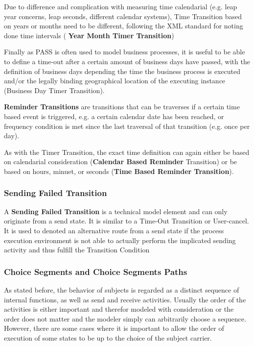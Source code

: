 Due to difference and complication with measuring time calendarial (e.g. leap year concerns, leap seconds, different calendar systems), Time Transition based on years or months need to be different, following the XML standard for noting done time intervals ( \textbf{Year Month Timer Transition})

Finally as PASS is often used to model business processes, it is useful to be able to define a time-out after a certain amount of business days have passed, with the definition of business days depending the time the business process is executed and/or the legally binding geographical location of the executing instance (Business Day Timer Transition).

\textbf{Reminder Transitions} are transitions that can be traverses if a certain time based event is triggered, e.g. a certain calendar date has been reached, or frequency condition is met  since the last traversal of that transition (e.g. once per day).

As with the Timer Transition, the exact time definition can again either be based on calendarial consideration (\textbf{Calendar Based Reminder} Transition) or be based on hours, minuet, or seconds (\textbf{Time Based Reminder Transition}).


\subsubsection{Sending Failed Transition}

A \textbf{Sending Failed Transition} is a technical model element and can only originate from a send state. It is similar to a Time-Out Transition or User-cancel. It is used to denoted an alternative route from a send state if the process execution environment is not able to actually perform the implicated sending activity and thus fulfill the Transition Condition


\subsubsection{Choice Segments and Choice Segments Paths}
\label{sec:choiceSegement}

As stated before, the behavior of subjects is regarded as a distinct sequence of internal functions, as well as send and receive activities. Usually the order of the activities is either important and therefor modeled with consideration or the order does not matter and the modeler simply can arbitrarily choose a sequence. However, there are some cases where it is important to allow the order of execution of some states to be up to the choice of the subject carrier.

